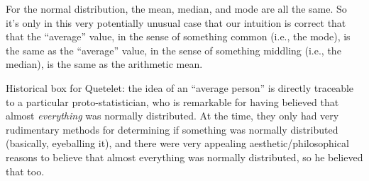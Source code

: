 For the normal distribution, the mean, median, and mode are all the
same. So it's only in this very potentially unusual case that our
intuition is correct that that the ``average'' value, in the sense of
something common (i.e., the mode), is the same as the ``average'' value,
in the sense of something middling (i.e., the median), is the same as
the arithmetic mean.

Historical box for Quetelet: the idea of an ``average person'' is
directly traceable to a particular proto-statistician, who is remarkable
for having believed that almost \emph{everything} was normally
distributed. At the time, they only had very rudimentary methods for
determining if something was normally distributed (basically, eyeballing
it), and there were very appealing aesthetic/philosophical reasons to
believe that almost everything was normally distributed, so he believed
that too.
